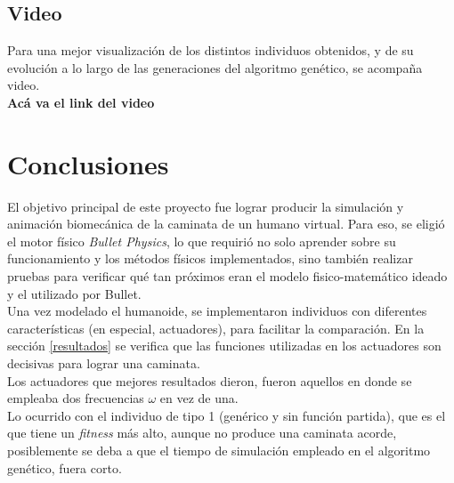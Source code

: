 \documentclass{article}
\begin{document}
\subsection{Video}
Para una mejor visualizaci\'on de los distintos individuos obtenidos, y de su evoluci\'on a lo largo de las generaciones del algoritmo gen\'etico, se acompa\~na video.\\
\textbf{Ac\'a va el link del video}



\section{Conclusiones}
El objetivo principal de este proyecto fue lograr producir la simulaci\'on y animaci\'on biomec\'anica de la caminata de un humano virtual. Para eso, se eligi\'o el motor f\'isico \textit{Bullet Physics}, lo que requiri\'o no solo aprender sobre su funcionamiento y los m\'etodos f\'isicos implementados, sino tambi\'en realizar pruebas para verificar qu\'e tan pr\'oximos eran el modelo fisico-matem\'atico ideado y el utilizado por Bullet.\\ %
Una vez modelado el humanoide, se implementaron individuos con diferentes caracter\'isticas (en especial, actuadores), para facilitar la comparaci\'on. En la secci\'on \ref{resultados} se verifica que las funciones utilizadas en los actuadores son decisivas para lograr una caminata.\\
Los actuadores que mejores resultados dieron, fueron aquellos en donde se empleaba dos frecuencias $\omega$ en vez de una.\\
Lo ocurrido con el individuo de tipo 1 (gen\'erico y sin funci\'on partida), que es el que tiene un \textit{fitness} m\'as alto, aunque no produce una caminata acorde, posiblemente se deba a que el tiempo de simulaci\'on empleado en el algoritmo gen\'etico, fuera corto.\\
\end{document}

